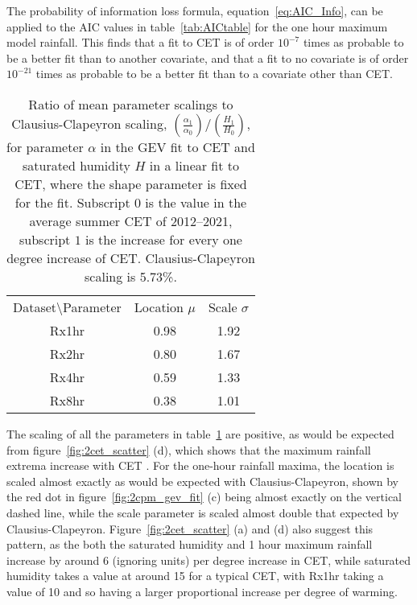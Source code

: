 The probability of information loss formula, equation~\ref{eq:AIC_Info},
    can be applied to the AIC values in table~\ref{tab:AICtable} for the one hour maximum model rainfall.
This finds that a fit to CET is of order $10^{-7}$ times as probable to be a better fit than to another covariate,
    and that a fit to no covariate is of order $10^{-21}$ times as probable to be a better fit than to a covariate other than CET.

\begin{table}[H]
    \centering
    \begin{tabular}{c c c}
        Dataset\textbackslash Parameter  & Location $\mu$ & Scale $\sigma$ \\
        Rx1hr &0.98&1.92 \\
        Rx2hr &0.80&1.67 \\
        Rx4hr &0.59&1.33 \\
        Rx8hr &0.38&1.01 \\
    \end{tabular}
    \caption{Ratio of mean parameter scalings to Clausius-Clapeyron scaling, $\left( \frac{\alpha_1}{\alpha_0} \right) / \left( \frac{H_1}{H_0} \right)$,
        for parameter $\alpha$ in the GEV fit to CET and saturated humidity $H$ in a linear fit to CET,
        where the shape parameter is fixed for the fit.
        Subscript $0$ is the value in the average summer CET of 2012--2021,
            subscript $1$ is the increase for every one degree increase of CET.
    Clausius-Clapeyron scaling is 5.73\%.}
    \label{tab:CCtable}
\end{table}

The scaling of all the parameters in table~\ref{tab:CCtable} are positive,
    as would be expected from figure~\ref{fig:2cet_scatter} (d),
    which shows that the maximum rainfall extrema increase with CET .
For the one-hour rainfall maxima,
    the location is scaled almost exactly as would be expected with Clausius-Clapeyron,
    shown by the red dot in figure~\ref{fig:2cpm_gev_fit} (c) being almost exactly on the vertical dashed line,
    while the scale parameter is scaled almost double that expected by Clausius-Clapeyron.
Figure~\ref{fig:2cet_scatter} (a) and (d) also suggest this pattern,
    as the both the saturated humidity and 1 hour maximum rainfall increase by around 6 (ignoring units)
    per degree increase in CET, while saturated humidity takes a value at around 15 for a typical CET,
    with Rx1hr taking a value of 10 and so having a larger proportional increase per degree of warming.


